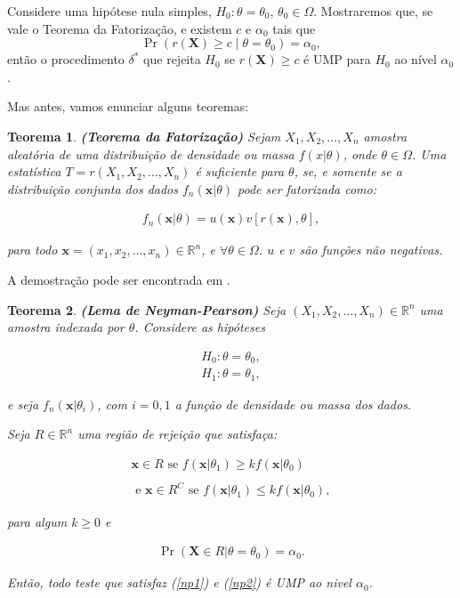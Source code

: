 \documentclass[a4paper,10pt, notitlepage]{report}
\newtheorem{teo}{Teorema}
\newcommand{\pr}{\operatorname{Pr}} %
\newcommand{\rs}{X_1, X_2, \ldots, X_n} %
\newcommand{\rsd}{x_1, x_2, \ldots, x_n} %
\newcommand{\bX}{\boldsymbol{X}} %
\newcommand{\bx}{\boldsymbol{x}} %
\begin{document}
	Considere uma hipótese nula simples, $H_0: \theta = \theta_0$, $\theta_0 \in \Omega$.
	Mostraremos que, se vale o Teorema da Fatorização, e existem $c$ e $\alpha_0$ tais que
	\begin{equation}
	\pr\left(r(\bX) \geq c \mid \theta = \theta_0\right) = \alpha_0\nonumber,
	\end{equation}
	então o procedimento $\delta^\ast$ que rejeita $H_0$ se $r(\bX) \geq c$ é UMP para $H_0$ ao nível $\alpha_0$.
	
	Mas antes, vamos enunciar alguns teoremas:
	
	\begin{teo}
		\textbf{(Teorema da Fatorização)\citep{degroot2012probability_fact}}
		Sejam $\rs$ amostra aleatória de uma distribuição de densidade ou massa $f(x|\theta)$, onde $\theta\in\Omega$. Uma estatística $T=r(\rs)$ é suficiente para $\theta$, se, e somente se a distribuição conjunta dos dados $f_n(\bx|\theta)$ pode ser fatorizada como:
		
		\begin{align*}
			f_n(\bx|\theta) = u(\bx)v[r(\bx),\theta],
		\end{align*}
		
		para todo $\bx= (\rsd)\in\mathbb{R}^n$, e $\forall \theta \in \Omega$. $u$ e $v$ são funções não negativas.
		
	\end{teo}

	A demostração pode ser encontrada em \citep{degroot2012probability_fact}.
	
	\begin{teo}
		\textbf{(Lema de Neyman-Pearson)\citep{CaseBerg:01}} Seja $(\rs)\in\mathbb{R}^n$ uma amostra indexada por $\theta$. Considere as hipóteses
		
		\begin{align}
		\label{hnp}
		H_0:\theta=\theta_0,\\
		H_1:\theta=\theta_1,\nonumber
		\end{align}
		
		e seja $f_n(\bx|\theta_i)$, com $i=0,1$ a função de densidade ou massa dos dados.
		
		Seja $R\in\mathbb{R}^n$ uma região de rejeição que satisfaça:
		
		\begin{align}
		\label{np1}
			\bx\in R\text{ se } f(\bx|\theta_1)\geq kf(\bx|\theta_0)\nonumber\\ \\\text{ e }\bx\in R^C\text{ se } f(\bx|\theta_1)\leq k f(\bx|\theta_0),\nonumber
		\end{align}
		
		para algum $k\geq0$ e 
		
		\begin{align}
		\label{np2}
			\pr(\bX\in R|\theta = \theta_0)=\alpha_0.
		\end{align}
		
		Então, todo teste que satisfaz (\ref{np1}) e (\ref{np2}) é UMP ao nivel $\alpha_0$.
	\end{teo}
\end{document}
